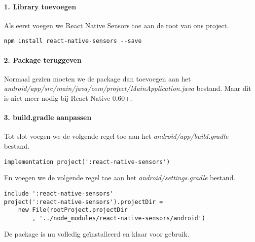 \paragraph{1. Library toevoegen}
Als eerst voegen we React Native Sensors toe aan de root van ons project.
\begin{verbatim}
npm install react-native-sensors --save
\end{verbatim}

\paragraph{2. Package teruggeven}
Normaal gezien moeten we de package dan toevoegen aan het 
\textit{android/app/src/main/java/com/project/MainApplication.java} bestand.
Maar dit is niet meer nodig bij React Native 0.60+.

\paragraph{3. build.gradle aanpassen}
Tot slot voegen we de volgende regel toe aan het \textit{android/app/build.gradle} bestand.
\begin{verbatim}
implementation project(':react-native-sensors')
\end{verbatim}
En voegen we de volgende regel toe aan het \textit{android/settings.gradle} bestand.
\begin{verbatim}
include ':react-native-sensors'
project(':react-native-sensors').projectDir = 
    new File(rootProject.projectDir
        , '../node_modules/react-native-sensors/android')
\end{verbatim}
De package is nu volledig geïnstalleerd en klaar voor gebruik.

